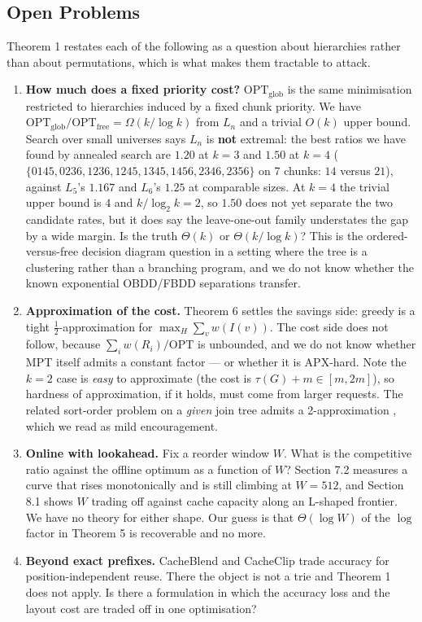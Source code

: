 \documentclass[11pt]{article}
\theoremstyle{plain}
\begin{document}
\subsection{Open Problems}

Theorem 1 restates each of the following as a question about hierarchies rather than about permutations, which is what makes them tractable to attack.

\begin{enumerate}
\item \textbf{How much does a fixed priority cost?} $\mathrm{OPT}_{\mathrm{glob}}$ is the same minimisation restricted to hierarchies induced by a fixed chunk priority. We have $\mathrm{OPT}_{\mathrm{glob}}/\mathrm{OPT}_{\mathrm{free}} = \Omega(k/\log k)$ from $L_n$ and a trivial $O(k)$ upper bound. Search over small universes says $L_n$ is \textbf{not} extremal: the best ratios we have found by annealed search are $1.20$ at $k=3$ and $\mathbf{1.50}$ at $k=4$ ($\{0145,0236,1236,1245,1345,1456,2346,2356\}$ on 7 chunks: $14$ versus $21$), against $L_5$'s $1.167$ and $L_6$'s $1.25$ at comparable sizes. At $k=4$ the trivial upper bound is $4$ and $k/\log_2 k = 2$, so $1.50$ does not yet separate the two candidate rates, but it does say the leave-one-out family understates the gap by a wide margin. Is the truth $\Theta(k)$ or $\Theta(k/\log k)$? This is the ordered-versus-free decision diagram question in a setting where the tree is a clustering rather than a branching program, and we do not know whether the known exponential OBDD/FBDD separations transfer.
\item \textbf{Approximation of the cost.} Theorem 6 settles the savings side: greedy is a tight $\tfrac12$-approximation for $\max_H \sum_v w(I(v))$. The cost side does not follow, because $\sum_i w(R_i)/\mathrm{OPT}$ is unbounded, and we do not know whether MPT itself admits a constant factor --- or whether it is APX-hard. Note the $k=2$ case is \emph{easy} to approximate (the cost is $\tau(G)+m \in [m,2m]$), so hardness of approximation, if it holds, must come from larger requests. The related sort-order problem on a \emph{given} join tree admits a 2-approximation \cite{GSD06}, which we read as mild encouragement.
\item \textbf{Online with lookahead.} Fix a reorder window $W$. What is the competitive ratio against the offline optimum as a function of $W$? Section 7.2 measures a curve that rises monotonically and is still climbing at $W = 512$, and Section 8.1 shows $W$ trading off against cache capacity along an L-shaped frontier. We have no theory for either shape. Our guess is that $\Theta(\log W)$ of the $\log$ factor in Theorem 5 is recoverable and no more.
\item \textbf{Beyond exact prefixes.} CacheBlend \cite{CB24} and CacheClip \cite{CC25} trade accuracy for position-independent reuse. There the object is not a trie and Theorem 1 does not apply. Is there a formulation in which the accuracy loss and the layout cost are traded off in one optimisation?
\end{enumerate}
\end{document}
